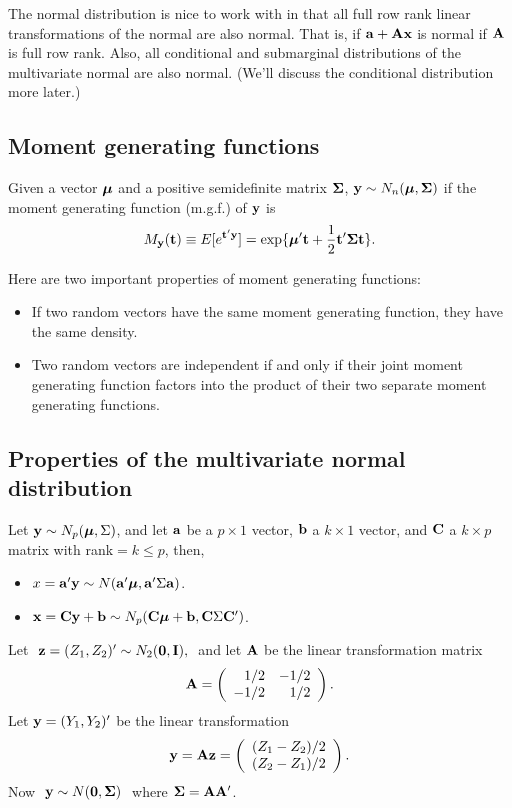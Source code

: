 The normal distribution is nice to work with in that
all full row rank linear transformations of the normal are
also normal. That is, if $\mathbf{a} + \mathbf{A} \mathbf{x}$ is normal if $\mathbf{A}$ is
full row rank. Also, all conditional and submarginal distributions
of the multivariate normal are also normal. (We'll discuss the
conditional distribution more later.)

\subsection{Moment generating functions}

Given a vector $\mbox{\boldmath $\mu$}$ and a positive
semidefinite matrix $\mathbf{\Sigma}$, $\mathbf{y} \sim N_n(\mbox{\boldmath $\mu$},\mathbf{\Sigma})$ if the moment generating function (m.g.f.) of $\mathbf{y}$ is
$$M_{\mathbf{y}}(\mathbf{t}) \equiv E[e^{\mathbf{t}'\mathbf{y}}] = \exp\{
	\mbox{\boldmath $\mu$}'\mathbf{t}+\frac{1}{2}\mathbf{t}'\mathbf{\Sigma}\mathbf{t} \}.$$

\vb
Here are two important properties of moment generating functions:
\begin{itemize}
\item  If two random vectors have the same moment generating function, they have the same density.
\item Two random vectors are independent if and only if their joint moment generating function factors into the product of their two separate moment generating functions.
\end{itemize}

\subsection{Properties of the multivariate normal distribution}

Let  $\mathbf{y} \sim N_p(\mbox{\boldmath $\mu$},\Sigma)$, and let $\bf a$ be a $p \times 1$ vector, $\mathbf{b}$ a $k \times 1$ vector, and  $\mathbf{C}$ a $k \times p$ matrix with rank$=k \le p$, then,
\begin{itemize}
\item $x =  \mathbf{a}'\mathbf{y}  \sim N(\mathbf{a}'\mbox{\boldmath $\mu$},\mathbf{a}'\Sigma\mathbf{a})$.

\vb
\item $\mathbf{x} =  \mathbf{C}\mathbf{y} + \mathbf{b} \sim N_p(\mathbf{C}\mbox{\boldmath $\mu$} +\mathbf{b},\mathbf{C}\Sigma\mathbf{C}')$.
\end{itemize}


\bexa
Let $\ \mathbf{z}=(Z_1,Z_2)' \sim N_2(\bf0,\mathbf{I}),\ $ and let $\mathbf{A}$ be the
linear transformation matrix
$$\mathbf{A}=\left(\begin{array}{rr}1/2&-1/2\\-1/2&1/2\end{array}\right).$$
Let $\mathbf{y}=(Y_1,Y_2)'$ be the linear transformation
$$\mathbf{y}=\mathbf{A}\mathbf{z}=
	\left(\begin{array}{c}(Z_1-Z_2)/2\\(Z_2-Z_1)/2\end{array}\right).$$
Now $\ \mathbf{y} \sim N({\bf 0},\mathbf{\Sigma})\ $ where
$\mathbf{\Sigma}=\mathbf{A}\mathbf{A}'$.
\eexa



